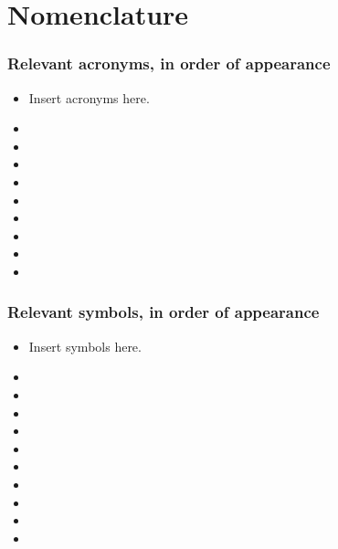 \section*{Nomenclature}

\subsubsection*{Relevant acronyms, in order of appearance}
\begin{itemize}
  \item[] Insert acronyms here.
  \item[]
  \item[]
  \item[]
  \item[]
  \item[]
  \item[]
  \item[]
  \item[]
  \item[]
\end{itemize}

\subsubsection*{Relevant symbols, in order of appearance}
\begin{itemize}
  \item[] Insert symbols here.
  \item[]
  \item[]
  \item[]
  \item[]
  \item[]
  \item[]
  \item[]
  \item[]
  \item[]
  \item[]
\end{itemize}